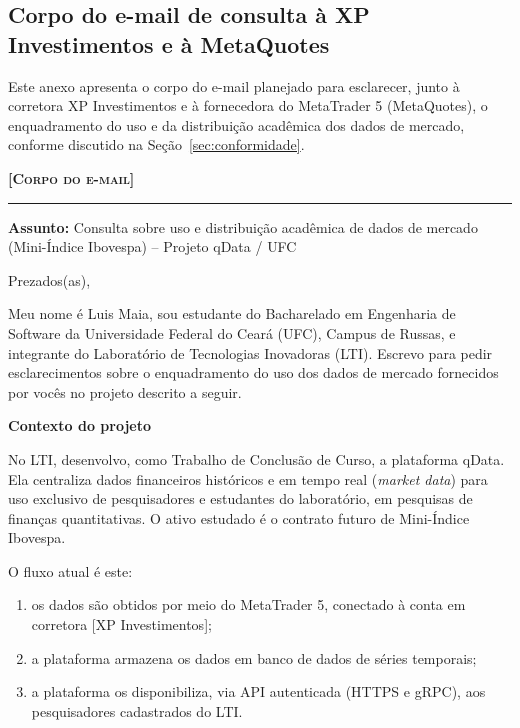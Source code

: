\begin{anexosenv}
\partanexos
\renewcommand{\thechapter}{\Roman{chapter}}

\chapter{Corpo do e-mail de consulta à XP Investimentos e à MetaQuotes}
\label{anexo:email}

Este anexo apresenta o corpo do e-mail planejado para esclarecer, junto à corretora XP Investimentos e à fornecedora do MetaTrader 5 (MetaQuotes), o enquadramento do uso e da distribuição acadêmica dos dados de mercado, conforme discutido na Seção~\ref{sec:conformidade}.

\vspace{1em}
\begin{framed}
\noindent\textbf{\textsc{[Corpo do e-mail]}}
\hrule
\vspace{0.5em}
\noindent\textbf{Assunto:} Consulta sobre uso e distribuição acadêmica de dados de mercado (Mini-Índice Ibovespa) -- Projeto qData / UFC

\vspace{1em}
\noindent Prezados(as),

Meu nome é Luis Maia, sou estudante do Bacharelado em Engenharia de Software da Universidade Federal do Ceará (UFC), Campus de Russas, e integrante do Laboratório de Tecnologias Inovadoras (LTI). Escrevo para pedir esclarecimentos sobre o enquadramento do uso dos dados de mercado fornecidos por vocês no projeto descrito a seguir.

\noindent\textbf{Contexto do projeto}

No LTI, desenvolvo, como Trabalho de Conclusão de Curso, a plataforma qData. Ela centraliza dados financeiros históricos e em tempo real (\textit{market data}) para uso exclusivo de pesquisadores e estudantes do laboratório, em pesquisas de finanças quantitativas. O ativo estudado é o contrato futuro de Mini-Índice Ibovespa.

O fluxo atual é este:
\begin{enumerate}
    \item os dados são obtidos por meio do MetaTrader 5, conectado à conta em corretora [XP Investimentos];
    \item a plataforma armazena os dados em banco de dados de séries temporais;
    \item a plataforma os disponibiliza, via API autenticada (HTTPS e gRPC), aos pesquisadores cadastrados do LTI.
\end{enumerate}


\end{framed}
\end{anexosenv}
